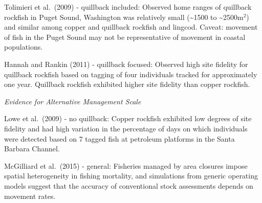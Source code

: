 \documentclass[11pt,
  english,
  letterpaper,
]{article}
\begin{document}
\leavevmode\tagmcend\tagstructend\par


Tolimieri et al.~{(2009)\leavevmode\tagmcend\tagstructend} - quillback included: Observed home ranges of quillback rockfish in Puget Sound, Washington was relatively small (\textasciitilde1500 to \textasciitilde2500m{\(^2\)\leavevmode\tagmcend\tagstructend}) and similar among copper and quillback rockfish and lingcod. Caveat: movement of fish in the Puget Sound may not be representative of movement in coastal populations.

\leavevmode\tagmcend\tagstructend\par


Hannah and Rankin {(2011)\leavevmode\tagmcend\tagstructend} - quillback focused: Observed high site fidelity for quillback rockfish based on tagging of four individuals tracked for approximately one year. Quillback rockfish exhibited higher site fidelity than copper rockfish.

\leavevmode\tagmcend\tagstructend\par


\emph{Evidence for Alternative Management Scale}

\leavevmode\tagmcend\tagstructend\par


Lowe et al.~{(2009)\leavevmode\tagmcend\tagstructend} - no quillback: Copper rockfish exhibited low degrees of site fidelity and had high variation in the percentage of days on which individuals were detected based on 7 tagged fish at petroleum platforms in the Santa Barbara Channel.

\leavevmode\tagmcend\tagstructend\par


McGilliard et al.~{(2015)\leavevmode\tagmcend\tagstructend} - general: Fisheries managed by area closures impose spatial heterogeneity in fishing mortality, and simulations from generic operating models suggest that the accuracy of conventional stock assessments depends on movement rates.
\end{document}
